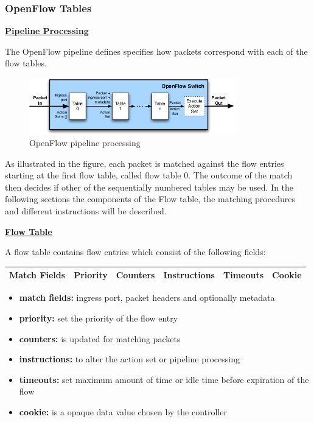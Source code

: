 \subsubsection{OpenFlow Tables}

\textbf{\underline{Pipeline Processing}}

The OpenFlow pipeline defines specifies how packets correspond with each of the flow tables. 

\begin{figure}[H]
\centering
\includegraphics[width=0.8\textwidth]{images/fundamentals/openflow_pipeline_processing.png}
\caption{OpenFlow pipeline processing}
\end{figure}

As illustrated in the figure, each packet is matched against the flow entries starting at the first flow table, called flow table 0. The outcome of the match then decides if other of the sequentially numbered tables may be used. In the following sections the components of the Flow table, the matching procedures and different instructions will be described.


\textbf{\underline{Flow Table}}

A flow table contains flow entries which consist of the following fields:

\begin{center}
\begin{tabular}{|c|c|c|c|c|c|}
\hline Match Fields & Priority & Counters & Instructions & Timeouts & Cookie \\ 
\hline 
\end{tabular} 
\end{center}

\begin{itemize}
\item \textbf{match fields:} ingress port, packet headers and optionally metadata
\item \textbf{priority:} set the priority of the flow entry
\item \textbf{counters:} is updated for matching packets
\item \textbf{instructions:} to alter the action set or pipeline processing
\item \textbf{timeouts:} set maximum amount of time or idle time before expiration of the flow
\item \textbf{cookie:} is a opaque data value chosen by the controller
\end{itemize}

